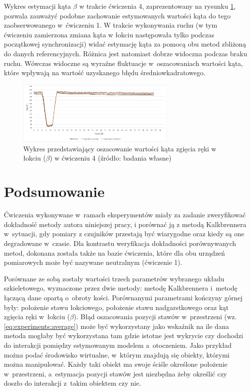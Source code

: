 Wykres estymacji kąta $\beta$ w trakcie ćwiczenia 4, zaprezentowany na rysunku \ref{fig:experiments:fourth:angle}, pozwala zauważyć podobne zachowanie estymowanych wartości kąta do tego zaobserwowanego w~ćwiczeniu 1. W trakcie wykonywania ruchu (w tym ćwiczeniu zamierzona zmiana kąta w łokciu następowała tylko podczas początkowej synchronizacji) widać estymację kąta za pomocą obu metod zbliżoną do danych referencyjnych. Różnica jest natomiast dobrze widoczna podczas braku ruchu. Wówczas widoczne są wyraźne fluktuacje w~oszacowaniach wartości kąta, które wpływają na wartość uzyskanego błędu średniowkadratowego.
			
	\begin{figure}[!htb]
		\centering
		\includegraphics[width=0.7\textwidth]{images/400/angle.png}
		\caption{Wykres przedstawiający oszacowanie wartości kąta zgięcia ręki w łokciu ($\beta$) w ćwiczeniu 4 (źródło: badania własne)}
		\label{fig:experiments:fourth:angle}
	\end{figure}
																			
\section{Podsumowanie}
																								
Ćwiczenia wykonywane w~ramach eksperymentów miały za zadanie zweryfikować dokładność metody autora niniejszej pracy, i porównać ją z metodą Kalkbrennera w~sytuacji, gdy pomiary z czujników przestają być wiarygodne oraz kiedy są one degradowane w~czasie. Dla kontrastu weryfikacja dokładności porównywanych metod, dokonana została także na bazie ćwiczenia, które dla obu urządzeń pomiarowych może być nazywane neutralnym (ćwiczenie 1).
																								
Porównane ze sobą zostały wartości trzech parametrów wybranego układu szkieletowego, wyznaczone przez dwie metody: metodę Kalkbrennera i~metodę łączącą dane opartą o~obroty kości. Porównanymi parametrami kończyny górnej były: położenie stawu łokciowego, położenie stawu nadgarstkowego oraz kąt zgięcia ręki w~łokciu ($\beta$). Błąd oszacowania pozycji stawów w~przestrzeni (wz. \ref{eq:experiments:average}) może być wykorzystany jako wskaźnik na ile dana metoda mogłaby być wykorzystana tam gdzie istotne jest wykrycie czy dochodzi do interakcji pomiędzy estymowanym modelem a~otoczeniem. Jako przykład można podać środowisko wirtualne, w~którym znajdują się obiekty, którymi można manipulować. Każdy taki obiekt ma swoje ściśle określone położenie w~przestrzeni, a~estymacja pozycji stawów jest niezbędna żeby określić czy doszło do interakcji z~takim obiektem czy nie.
																								 
